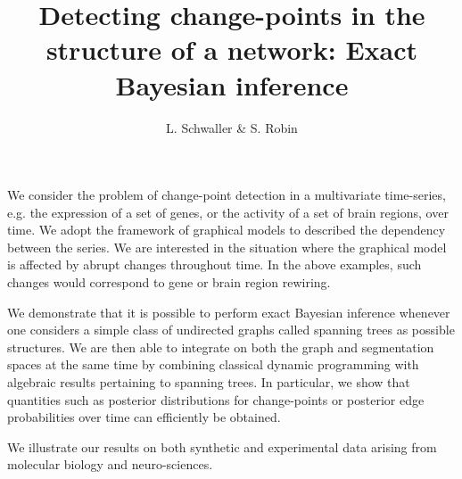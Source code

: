\documentclass[12pt]{article}
\begin{document}
\title{Detecting change-points in the structure of a network: Exact Bayesian inference}
\author{L. Schwaller \& S. Robin}

\date{}
\maketitle


We consider the problem of change-point detection in a multivariate time-series, e.g. the expression of a set of genes, or the activity of a set of brain regions, over time. We adopt the framework of graphical models to described the dependency between the series. We are interested in the situation where the graphical model is affected by abrupt changes throughout time. In the above examples, such changes would correspond to gene or brain region rewiring.

We demonstrate that it is possible to perform exact Bayesian inference whenever one considers a simple class of undirected graphs called spanning trees as possible structures. We are then able to integrate on both the graph and segmentation spaces at the same time by combining classical dynamic programming with algebraic results pertaining to spanning trees. In particular, we show that quantities such as posterior distributions for change-points or posterior edge probabilities over time can efficiently be obtained. 

We illustrate our results on both synthetic and experimental data arising from molecular biology and neuro-sciences. 

\nocite{ScR16}


\end{document}
